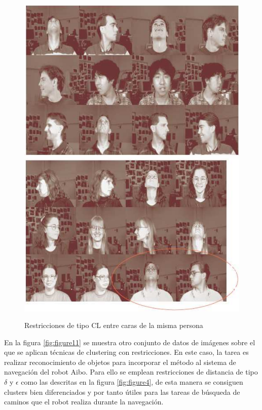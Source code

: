 \begin{figure}[bth]
	\myfloatalign
	{\includegraphics[width=.4\linewidth]{imagenes/c3/AnalisisImagenes/CarasDifOr1}} \quad
	{\includegraphics[width=.4\linewidth]{imagenes/c3/AnalisisImagenes/CarasDifOr2}}
	\caption{Restricciones de tipo \ac{CL} entre caras de la misma persona  \cite{Survey:2007}}\label{fig:figure10}
\end{figure}

En la figura \ref{fig:figure11} se muestra otro conjunto de datos de imágenes sobre el que se aplican técnicas de clustering con restricciones. En este caso, la tarea es realizar reconocimiento de objetos para incorporar el método al sistema de navegación del robot Aibo. Para ello se emplean restricciones de distancia de tipo $\delta$ y $\epsilon$ como las descritas en la figura \ref{fig:figure4}, de esta manera se consiguen clusters bien diferenciados y por tanto útiles para las tareas de búsqueda de caminos que el robot realiza durante la navegación.

